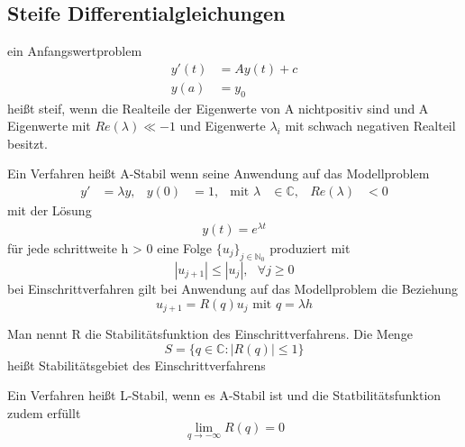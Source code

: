 \documentclass[
	ngerman,
	accentcolor=9c,%
	type=intern,
	marginpar=false
	]{tudapub}
\begin{document}
        \subsection{Steife Differentialgleichungen}
        \setcounter{satz}{1}
        \begin{definition}
            ein Anfangswertproblem
            \begin{align*}
                y'(t) &= Ay(t)+c\\
                y(a) &= y_0
            \end{align*}
            heißt steif, wenn die Realteile der Eigenwerte von A nichtpositiv sind und A Eigenwerte mit $Re(\lambda) \ll -1$
            und Eigenwerte $\lambda_i$ mit schwach negativen Realteil besitzt. 
        \end{definition}
        \begin{definition}
            Ein Verfahren heißt A-Stabil wenn seine Anwendung auf das Modellproblem
            \begin{align*}
                y' &= \lambda y , & y(0) &= 1, & \text{mit } \lambda &\in \mathbb{C}, & Re(\lambda)&<0
            \end{align*}
            mit der Lösung
            \begin{align*}
                y(t) = e^{\lambda t}
            \end{align*}
            für jede schrittweite h > 0 eine Folge $\{u_j\}_{j\in\mathbb{N}_0}$ produziert mit
            \begin{equation*}
                |u_{j+1}| \leq |u_j|, \mbox{    }\forall j \geq 0
            \end{equation*}
            bei Einschrittverfahren gilt bei Anwendung auf das Modellproblem die Beziehung
            \begin{equation*}
                u_{j+1} = R(q) u_j \mbox{ mit } q = \lambda h
            \end{equation*}
        \end{definition}
        \setcounter{satz}{4}
        \begin{definition}
            Man nennt R die Stabilitätsfunktion des Einschrittverfahrens. Die Menge
            \begin{equation*}
                S = \{q \in \mathbb{C} : |R(q)| \leq 1\}
            \end{equation*}
            heißt Stabilitätsgebiet des Einschrittverfahrens
        \end{definition}
        \begin{definition}
            Ein Verfahren heißt L-Stabil, wenn es A-Stabil ist und die Statbilitätsfunktion zudem erfüllt
            \begin{equation*}
                \lim_{q \rightarrow - \infty} R(q) = 0
            \end{equation*}
        \end{definition}
\end{document}
